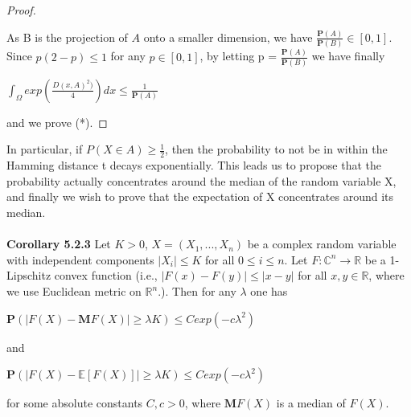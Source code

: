 \documentclass{article}
\begin{document}
\begin{proof}
\begin{center}
    \end{center}
    As B is the projection of $A$ onto a smaller dimension, we have $\frac{\mathbf{P}(A)}{\mathbf{P}(B)} \in [0, 1]$. Since $p(2-p) \leq 1$ for any $p \in [0, 1]$, by letting p = $\frac{\mathbf{P}(A)}{\mathbf{P}(B)}$ we have finally
    \begin{center}
        $\int_{\Omega}exp(\frac{D(x, A)^2)}{4})dx \leq \frac{1}{\mathbf{P}(A)}$ 
    \end{center}
    and we prove (*).
\end{proof}
In particular, if $P(X \in A) \geq \frac{1}{2}$, then the probability to not be in within the Hamming distance t decays exponentially. This leads us to propose that the probability actually concentrates around the median of the random variable X, and finally we wish to prove that the expectation of X concentrates around its median.\\
\\
\textbf{Corollary 5.2.3} Let $K>0$, $X = (X_1, ..., X_n)$ be a complex random variable with independent components $|X_i| \leq K$ for all $0 \leq i \leq n$. Let $F: \mathbb{C}^n \rightarrow \mathbb{R}$ be a 1-Lipschitz convex function (i.e., $|F(x) - F(y)|\leq |x-y|$ for all $x,y \in \mathbb{R}$, where we use Euclidean metric on $\mathbb{R}^n$.). Then for any $\lambda$ one has
\begin{center}
    $\mathbf{P}(|F(X) - \mathbf{M}F(X)|\geq \lambda K) \leq Cexp(-c\lambda^2)$
\end{center}
and
\begin{center}
    $\mathbf{P}(|F(X) - \mathbb{E}[F(X)]|\geq \lambda K) \leq Cexp(-c\lambda^2)$
\end{center}
for some absolute constants $C, c > 0$, where $\mathbf{M}F(X)$ is a median of $F(X)$.
\end{document}
